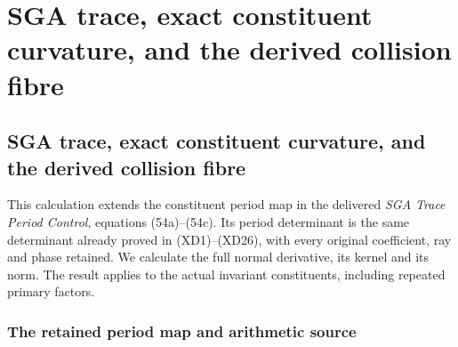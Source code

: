 \begingroup

\section{SGA trace, exact constituent curvature, and the derived collision fibre}


\subsection{SGA trace, exact constituent curvature, and the derived collision fibre}
\label{sec:sga-constituent-period-curvature}

This calculation extends the constituent period map in the delivered
\emph{SGA Trace Period Control}, equations (54a)--(54c).  Its period
determinant is the same determinant already proved in (XD1)--(XD26),
with every original coefficient, ray and phase retained.  We calculate
the full normal derivative, its kernel and its norm.  The result applies
to the actual invariant constituents, including repeated primary factors.

\subsubsection{The retained period map and arithmetic source}

